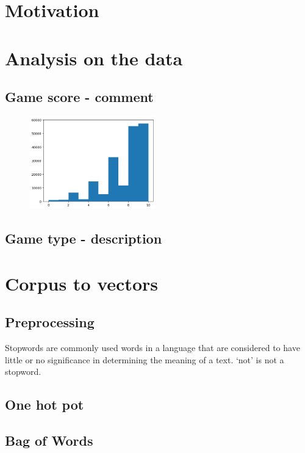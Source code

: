 \documentclass{article}
\begin{document}
\tableofcontents

\section{Motivation}

\section{Analysis on the data}

\subsection{Game score - comment}

\begin{figure}[h]
  \centering
  \includegraphics[height=4cm]{scores.png}
\end{figure}

\subsection{Game type - description}

\section{Corpus to vectors}

\subsection{Preprocessing}

Stopwords are commonly used words in a language that are considered to have little or no significance in determining the meaning of a text.
`not' is not a stopword.

\subsection{One hot pot}

\subsection{Bag of Words}
\end{document}

